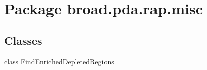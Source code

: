 \hypertarget{namespacebroad_1_1pda_1_1rap_1_1misc}{\section{Package broad.\+pda.\+rap.\+misc}
\label{namespacebroad_1_1pda_1_1rap_1_1misc}
}
\subsection*{Classes}
\begin{DoxyCompactItemize}
\item 
class \hyperlink{classbroad_1_1pda_1_1rap_1_1misc_1_1_find_enriched_depleted_regions}{Find\+Enriched\+Depleted\+Regions}
\end{DoxyCompactItemize}
